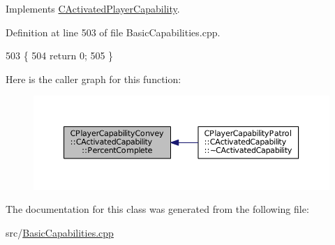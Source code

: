 Implements \hyperlink{classCActivatedPlayerCapability_a405dc6076058006a4f801727de4cfe4d}{C\+Activated\+Player\+Capability}.



Definition at line 503 of file Basic\+Capabilities.\+cpp.


\begin{DoxyCode}
503                                                                        \{
504     \textcolor{keywordflow}{return} 0;
505 \}
\end{DoxyCode}
Here is the caller graph for this function\+:\nopagebreak
\begin{figure}[H]
\begin{center}
\leavevmode
\includegraphics[width=350pt]{classCPlayerCapabilityConvey_1_1CActivatedCapability_aec6b75fc004f4ac18755d8f601c8ffca_icgraph}
\end{center}
\end{figure}


The documentation for this class was generated from the following file\+:\begin{DoxyCompactItemize}
\item 
src/\hyperlink{BasicCapabilities_8cpp}{Basic\+Capabilities.\+cpp}\end{DoxyCompactItemize}
